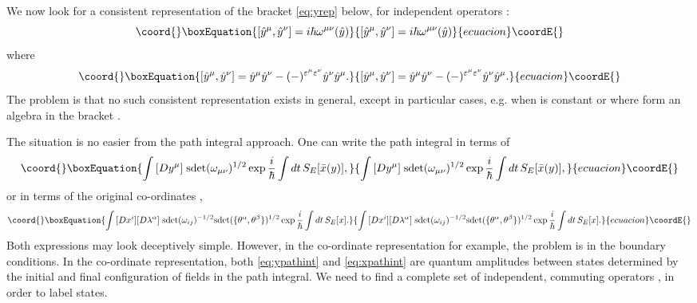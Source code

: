 \documentclass[a4paper,12pt]{article}
\theoremstyle{definition}
\theoremstyle{remark}
\numberwithin{equation}{section}
\providecommand{\al}{\alpha}
\providecommand{\be}{\beta}
\providecommand{\ga}{\gamma}
\providecommand{\la}{\lambda}
\providecommand{\om}{\omega}
\providecommand{\eps}{\varepsilon}
\providecommand{\yh}{\hat{y}}
\providecommand{\bx}{\bar{x}}
\begin{document}
We now look for a consistent representation of the bracket
\eqref{eq:yrep} below, for independent operators \coordHE{}:
\begin{equation}\coord{}\boxEquation{\label{eq:yrep}
[\yh^\mu,\yh^\nu]=i\hbar \om^{\mu\nu}(\yh)
}{[\yh^\mu,\yh^\nu]=i\hbar \om^{\mu\nu}(\yh)
}{ecuacion}\coordE{}\end{equation}
where
\begin{equation}\coord{}\boxEquation{
[\yh^\mu,\yh^\nu]=\yh^\mu \yh^\nu -(-)^{\eps^\mu \eps^\nu} \yh^\nu
\yh^\mu.
}{
[\yh^\mu,\yh^\nu]=\yh^\mu \yh^\nu -(-)^{\eps^\mu \eps^\nu} \yh^\nu
\yh^\mu.
}{ecuacion}\coordE{}\end{equation}
The problem is that no such consistent representation exists in
general, except in particular cases, e.g. when \myHighlight{$\om^{\mu\nu}$}\coordHE{} is
constant or where \myHighlight{$\yh^\mu$}\coordHE{} form an algebra in the bracket \myHighlight{$[,]$}\coordHE{}.


The situation is no easier from the path integral approach. One
can write the path integral in terms of \coordHE{}
\begin{equation}\coord{}\boxEquation{\label{eq:ypathint}
\int{[Dy^\mu]\; \text{sdet}(\om_{\mu\nu})^{1/2}
\exp{\frac{i}{\hbar}\int{dt \, S_E[\bx(y)]}}},
}{\int{[Dy^\mu]\; \text{sdet}(\om_{\mu\nu})^{1/2}
\exp{\frac{i}{\hbar}\int{dt \, S_E[\bx(y)]}}},
}{ecuacion}\coordE{}\end{equation}
or in terms of the original co-ordinates \coordHE{},
\begin{equation}\coord{}\boxEquation{\label{eq:xpathint}
\int{[Dx^i] [D\la^{\al}]\; \text{sdet}(\om_{ij})^{-1/2}
\text{sdet}(\{\theta^\al,\theta^\be\})^{1/2}
\exp{\frac{i}{\hbar}\int{dt \, S_E[x]}}}.
}{\int{[Dx^i] [D\la^{\al}]\; \text{sdet}(\om_{ij})^{-1/2}
\text{sdet}(\{\theta^\al,\theta^\be\})^{1/2}
\exp{\frac{i}{\hbar}\int{dt \, S_E[x]}}}.
}{ecuacion}\coordE{}\end{equation}
Both expressions may look deceptively simple. However, in the
co-ordinate representation for example, the problem is in the
boundary conditions. In the co-ordinate representation, both
\eqref{eq:ypathint} and \eqref{eq:xpathint} are quantum amplitudes
between states determined by the initial and final configuration
of fields in the path integral. We need to find a complete set of
\coordHE{} independent, commuting operators \myHighlight{$\hat{Q}^{\ga}$}\coordHE{}, in order
to label states.
\end{document}
